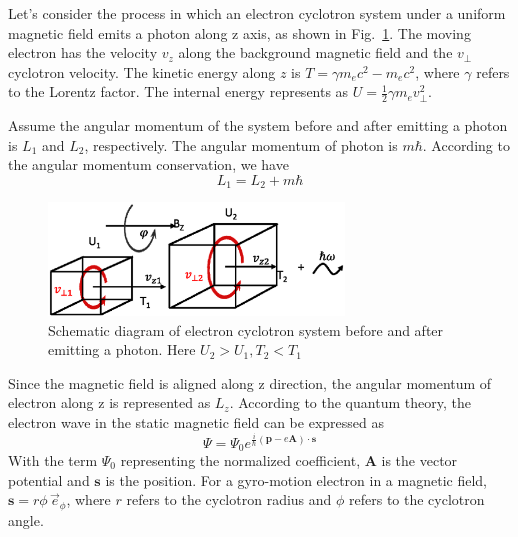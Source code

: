 \documentclass{cpbtex3}
\begin{document}
Let's consider the process in which an electron cyclotron system under a uniform magnetic field emits a photon along z axis, as shown in Fig.~\ref{fig:Schematic}. The moving electron has the velocity $v_z$ along the background magnetic field and the $v_\perp$ cyclotron velocity. The kinetic energy along $z$ is $T = \gamma m_e c^2 - m_e c^2$, where $\gamma$ refers to the Lorentz factor. The internal energy represents as $U = \frac{1}{2} \gamma m_e v_\perp^2$. 

Assume the angular momentum of the system before and after emitting a photon is $L_1$ and $L_2$, respectively. The angular momentum of photon is $m\hbar$. According to the angular momentum conservation, we have
\begin{equation}
L_1 = L_2 + m\hbar \label{eq:AngularCon} 
\end{equation}

\begin{figure}
\centering
\includegraphics[width=0.7\textwidth]{Figure3.eps}%
\caption{\label{fig:Schematic}Schematic diagram of electron cyclotron system before and after emitting a photon. Here \(U_2>U_1, T_2<T_1\)}
\end{figure}


Since the magnetic field is aligned along z direction, the angular momentum of electron along z is represented as $L_z$. According to the quantum theory, the electron wave in the static magnetic field can be expressed as
\begin{equation}
\Psi = \Psi_0 e^{\frac{i}{\hbar} (\mathbf{p} - e\mathbf{A}) \cdot \mathbf{s}} \label{eq:psi}
\end{equation}
With the term $\Psi_0$ representing the normalized coefficient, $\mathbf{A}$ is the vector potential and $\mathbf{s}$ is the position. For a gyro-motion electron in a magnetic field, $\mathbf{s} = r\phi\,\vec{e}_\phi$, where $r$ refers to the cyclotron radius and $\phi$ refers to the cyclotron angle. 
\end{document}
